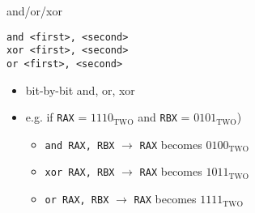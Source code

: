 \begin{frame}[fragile,label=andOrXor]{and/or/xor}
\begin{lstlisting}
and <first>, <second>
xor <first>, <second>
or <first>, <second>
\end{lstlisting}
\begin{itemize}
\item bit-by-bit and, or, xor
\item e.g. if {\tt RAX} = $1110_\text{TWO}$ and {\tt RBX} = $0101_\text{TWO}$)
\begin{itemize}
\item \lstinline|and RAX, RBX| $\rightarrow$ {\tt RAX} becomes $0100_\text{TWO}$
\item \lstinline|xor RAX, RBX| $\rightarrow$ {\tt RAX} becomes $1011_\text{TWO}$
\item \lstinline|or RAX, RBX| $\rightarrow$ {\tt RAX} becomes $1111_\text{TWO}$
\end{itemize}
\end{itemize}
\end{frame}
